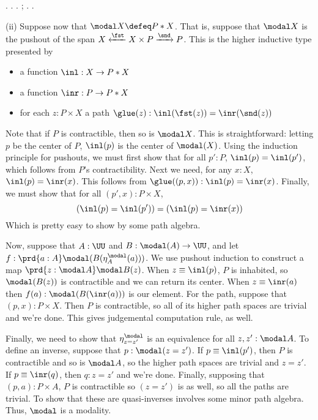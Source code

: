 \begin{coqdoccode}
\coqdocindent{1.00em}
 .  .\coqdoceol
\coqdocindent{1.00em}
 .\coqdoceol
\coqdocindent{1.00em}
 ;  .\coqdoceol
\coqdocnoindent
{}.\coqdoceol
\coqdocemptyline
\end{coqdoccode}
(ii)
Suppose now that $\modal X \defeq P * X$.  That is, suppose that $\modal X$ is
the pushout of the span $X \xleftarrow{\fst} X \times P \xrightarrow{\snd}
P$.  This is the higher inductive type presented by



\begin{itemize}
\item  a function $\inl : X \to P * X$

\item  a function $\inr : P \to P * X$

\item  for each $z : P \times X$ a path $\glue(z) : \inl(\fst(z)) = \inr(\snd(z))$

\end{itemize}
Note that if $P$ is contractible, then so is $\modal X$.  This is
straightforward: letting $p$ be the center of $P$, $\inl(p)$ is the center of
$\modal(X)$.  Using the induction principle for pushouts, we must first show
that for all $p' : P$, $\inl(p) = \inl(p')$, which follows from $P$'s
contractibility.  Next we need, for any $x : X$, $\inl(p) = \inr(x)$.  This
follows from $\glue((p, x)) : \inl(p) = \inr(x)$.  Finally, we must show that
for all $(p', x) : P \times X$, 
\[
  (\inl(p) = \inl(p')) = (\inl(p) = \inr(x))
\]
Which is pretty easy to show by some path algebra.


Now, suppose that $A : \UU$ and $B : \modal(A) \to \UU$, and let $f : \prd{a:A}
\modal(B(\eta^{\modal}_{A}(a)))$.  We use pushout induction to construct a map
$\prd{z:\modal A} \modal B(z)$.  When $z \equiv \inl(p)$, $P$ is inhabited, so
$\modal (B (z))$ is contractible and we can return its center.  When $z \equiv
\inr(a)$ then $f(a) : \modal(B(\inr(a)))$ is our element.  For the path,
suppose that $(p, x) : P \times X$.  Then $P$ is contractible, so all of its
higher path spaces are trivial and we're done.  This gives judgemental
computation rule, as well.


Finally, we need to show that $\eta^{\modal}_{z = z'}$ is an equivalence for
all $z, z' : \modal A$.  To define an inverse, suppose that $p : \modal(z =
z')$.  If $p \equiv \inl(p')$, then $P$ is contractible and so is $\modal A$,
so the higher path spaces are trivial and $z = z'$.  If $p \equiv \inr(q)$,
then $q : z = z'$ and we're done.  Finally, supposing that $(p, a) : P \times
A$, $P$ is contractible so $(z = z')$ is as well, so all the paths are trivial.
To show that these are quasi-inverses involves some minor path algebra.  Thus,
$\modal$ is a modality.


